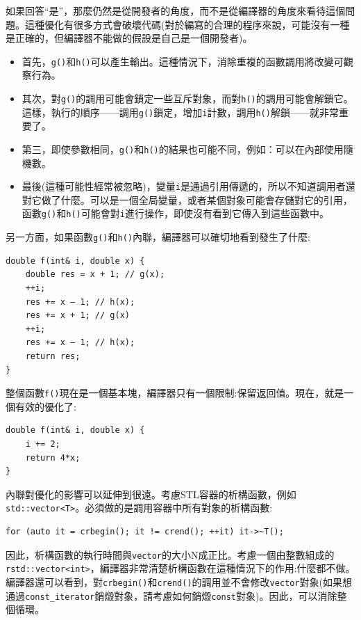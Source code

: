 如果回答“是”，那麼仍然是從開發者的角度，而不是從編譯器的角度來看待這個問題。這種優化有很多方式會破壞代碼(對於編寫的合理的程序來說，可能沒有一種是正確的，但編譯器不能做的假設是自己是一個開發者)。 

\begin{itemize}
\item
首先，\texttt{g()}和\texttt{h()}可以產生輸出。這種情況下，消除重複的函數調用將改變可觀察行為。 

\item
其次，對\texttt{g()}的調用可能會鎖定一些互斥對象，而對\texttt{h()}的調用可能會解鎖它。這樣，執行的順序——調用\texttt{g()}鎖定，增加\texttt{i}計數，調用\texttt{h()}解鎖——就非常重要了。 

\item
第三，即使參數相同，\texttt{g()}和\texttt{h()}的結果也可能不同，例如：可以在內部使用隨機數。 

\item
最後(這種可能性經常被忽略)，變量\texttt{i}是通過引用傳遞的，所以不知道調用者還對它做了什麼。可以是一個全局變量，或者某個對象可能會存儲對它的引用，函數\texttt{g()}和\texttt{h()}可能會對\texttt{i}進行操作，即使沒有看到它傳入到這些函數中。 
	
\end{itemize}

另一方面，如果函數\texttt{g()}和\texttt{h()}內聯，編譯器可以確切地看到發生了什麼:

\begin{lstlisting}[style=styleCXX]
double f(int& i, double x) {
	double res = x + 1; // g(x);
	++i;
	res += x – 1; // h(x);
	res += x + 1; // g(x)
	++i;
	res += x – 1; // h(x);
	return res;
}
\end{lstlisting}

整個函數\texttt{f()}現在是一個基本塊，編譯器只有一個限制:保留返回值。現在，就是一個有效的優化了:

\begin{lstlisting}[style=styleCXX]
double f(int& i, double x) {
	i += 2;
	return 4*x;
}
\end{lstlisting}

內聯對優化的影響可以延伸到很遠。考慮STL容器的析構函數，例如\texttt{std::vector<T>}。必須做的是調用容器中所有對象的析構函數:

\begin{lstlisting}[style=styleCXX]
for (auto it = crbegin(); it != crend(); ++it) it->~T();
\end{lstlisting}

因此，析構函數的執行時間與\texttt{vector}的大小N成正比。考慮一個由整數組成的\texttt{rstd::vector<int>}，編譯器非常清楚析構函數在這種情況下的作用:什麼都不做。編譯器還可以看到，對\texttt{crbegin()}和\texttt{crend()}的調用並不會修改\texttt{vector}對象(如果想通過\texttt{const\_iterator}銷燬對象，請考慮如何銷燬\texttt{const}對象)。因此，可以消除整個循環。

